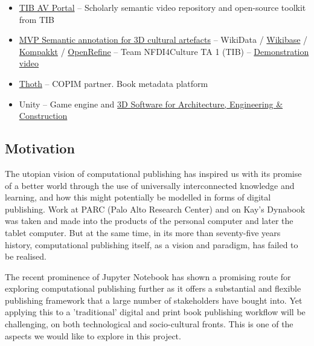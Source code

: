 \documentclass{article}
\begin{document}
\begin{itemize}
\begin{itemize}
\item \href{https://av.tib.eu/ }{TIB AV Portal} – Scholarly semantic video repository and open-source toolkit from TIB


\item \href{https://mvp.enrich-nfdi4culture.wiki/wiki/Main_Page}{MVP Semantic annotation for 3D cultural artefacts} – WikiData / \href{https://wikiba.se/}{Wikibase} / \href{https://kompakkt.de/home}{Kompakkt} / \href{https://openrefine.org/}{OpenRefine} – Team NFDI4Culture TA 1 (TIB) – \href{https://drive.google.com/file/d/1Umn2JS_-GEQONIdJ_ttlThl1VkwUwpae/view}{Demonstration video} 


\item \href{https://thoth.pub/}{Thoth} – COPIM partner. Book metadata platform


\item Unity – Game engine and \href{https://unity.com/solutions/architecture-engineering-construction}{3D Software for Architecture, Engineering \& Construction} 


\end{itemize}

\end{itemize}\addtocounter{footnote}{-1}

\subsection{Motivation}\label{H2831995}



The utopian vision of computational publishing has inspired us with its promise of a better world through the use of universally interconnected knowledge and learning, and how this might potentially be modelled in forms of digital publishing. Work at PARC (Palo Alto Research Center) and on Kay's Dynabook was taken and made into the products of the personal computer and later the tablet computer. But at the same time, in its more than seventy-five years history, computational publishing itself, as a vision and paradigm, has failed to be realised. 


The recent prominence of Jupyter Notebook has shown a promising route for exploring computational publishing further as it offers a substantial and flexible publishing framework that a large number of stakeholders have bought into. Yet applying this to a 'traditional' digital and print book publishing workflow will be challenging, on both technological and socio-cultural fronts. This is one of the aspects we would like to explore in this project.
\end{document}
